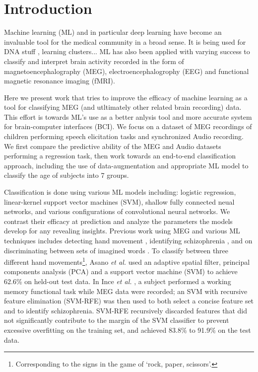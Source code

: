 \documentclass[utf8]{frontiersSCNS} %
\begin{document}
\section{Introduction}


Machine learning (ML) and in particular deep learning have become an invaluable tool for the medical community in a broad sense. It is being used for DNA stuff \cite{}, learning clusters... ML has also been applied with varying success to classify and interpret brain activity recorded in the form of magnetoencephalography (MEG), electroencephalogrophy (EEG) and functional magnetic resonance imaging (fMRI).

Here we present work that tries to improve the efficacy of machine learning as a tool for classifying MEG (and utltimately other related brain recording) data. This effort is towards ML's use as a better anlysis tool and more accurate system for brain-computer interfaces (BCI). We focus on a dataset of MEG recordings of children performing speech elicitation tasks and synchronized Audio recording. We first compare the predictive ability of the MEG and Audio datasets performing a regression task, then work towards an end-to-end classification approach, including the use of data-augmentation and appropriate ML model to classify the age of subjects into 7 groups.

Classification is done using various ML models including: logistic regression, linear-kernel support vector machines (SVM), shallow fully connected neual networks, and various configurations of convolutional neural networks. We contrast their efficacy at prediction and analyze the parameters the models develop for any revealing insights. Previous work using MEG and various ML techniques includes detecting hand movement \cite{Asano2009}, identifying schizophrenia \cite{Ince2008}, and on discriminating between sets of imagined words \cite{Guimaraes2007}. To classify between three different hand movements\footnote{Corresponding to the signs in the game of `rock, paper, scissors'.}, Asano {\em et al.} \cite{Asano2009} used an adaptive spatial filter, principal components analysis (PCA) and a support vector machine (SVM) to achieve 62.6\% on held-out test data. In Ince {\em et al.} \cite{Ince2008}, a subject performed a working memory functional task while MEG data were recorded; an SVM with recursive feature elimination (SVM-RFE) was then used to both select a concise feature set and to identify schizophrenia. SVM-RFE recursively discarded features that did not significantly contribute to the margin of the SVM classifier to prevent excessive overfitting on the training set, and achieved 83.8\% to 91.9\% on the test data.
\end{document}
